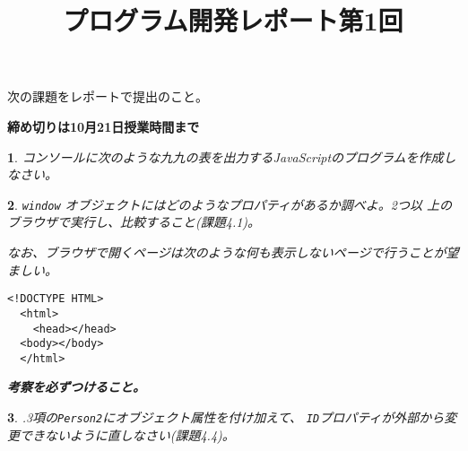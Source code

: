\documentclass[a4j]{jarticle}
\title{プログラム開発レポート第1回}
\author{}
\date{}
\newtheorem{Prob}{}
\begin{document}
\maketitle
次の課題をレポートで提出のこと。

{\bfseries 締め切りは10月21日授業時間まで}
\begin{Prob}\upshape
 コンソールに次のような九九の表を出力するJavaScriptのプログラムを作成し
 なさい。
 
\end{Prob}
\begin{Prob}
 \upshape
\verb+window+ オブジェクトにはどのようなプロパティがあるか調べよ。2つ以
 上のブラウザで実行し、比較すること(課題4.1)。

 なお、ブラウザで開くページは次のような何も表示しないページで行うことが望ましい。
\begin{verbatim}
<!DOCTYPE HTML>
  <html>
    <head></head>
  <body></body>
  </html>
\end{verbatim}
 {\bfseries 考察を必ずつけること。}
\end{Prob}
\begin{Prob}
 .3項の\texttt{Person2}にオブジェクト属性を付け加えて、
 \texttt{ID}プロパティが外部から変更できないように直しなさい(課題4.4)。
\end{Prob}
\end{document}
